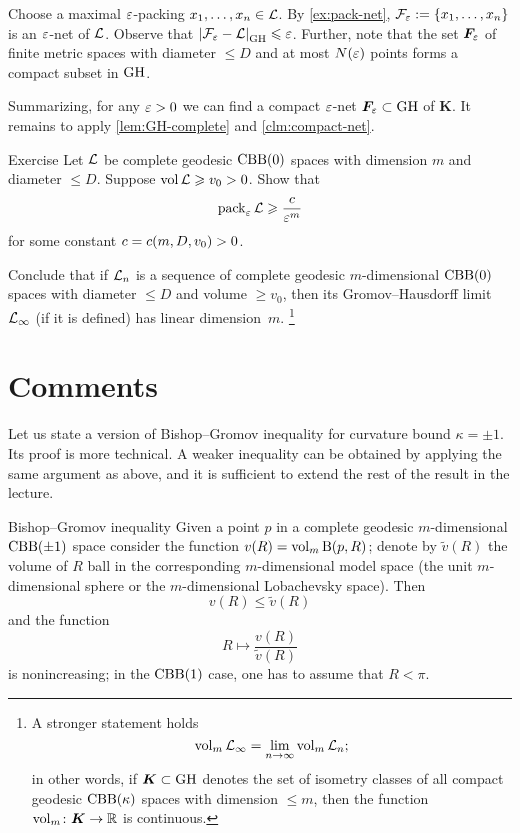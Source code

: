 Choose a maximal $\varepsilon$-packing $x_1,\dots,x_n\in \mathcal{L}$.
By \ref{ex:pack-net}, $\spc{F}_\eps\z\df\{x_1,\dots,x_n\}$ is an $\varepsilon$-net of $\mathcal{L}$.
Observe that $\dist{\spc{F}_\eps}{\spc{L}}{\GH}\le \eps$.
Further, note that the set $\bm{F}_\varepsilon$ of finite metric spaces with diameter $\le D$ and at most $N(\varepsilon)$ points forms a compact subset in $\operatorname{\rm GH}\nolimits$.

Summarizing, for any $\varepsilon>0$ we can find a compact $\varepsilon$-net $\bm{F}_\varepsilon\subset \operatorname{\rm GH}\nolimits$ of $\bm{K}$.
It remains to apply \ref{lem:GH-complete} and \ref{clm:compact-net}.
\qeds

\begin{thm}{Exercise}\label{ex:pack-vol}
Let $\mathcal{L}$ be complete geodesic $\mathrm{CBB}(0)$ spaces with dimension $m$ and diameter $\le D$.
Suppose $\operatorname{\rm vol}\nolimits\mathcal{L}\geqslant v_0>0$.
Show that 
\[\operatorname{\rm pack}\nolimits_\varepsilon\mathcal{L}\geqslant \frac{c}{\varepsilon^m}\]
for some constant $c=c(m,D,v_0)>0$.

Conclude that if $\mathcal{L}_n$ is a sequence of complete geodesic $m$-dimensional $\mathrm{CBB}(0)$ spaces with diameter $\le D$ and volume $\ge v_0$, then its Gromov--Hausdorff limit $\mathcal{L}_\infty$ (if it is defined) has linear dimension~$m$.%
\footnote{A stronger statement holds 
\[\operatorname{\rm vol}\nolimits_m\mathcal{L}_\infty=\lim_{n\to\infty} \operatorname{\rm vol}\nolimits_m\mathcal{L}_n;\]
in other words, if $\bm{K}\subset \operatorname{\rm GH}\nolimits$ denotes the set of isometry classes of all compact geodesic $\mathrm{CBB}(\kappa)$ spaces with dimension $\le m$, then the function
$\operatorname{\rm vol}\nolimits_m\colon\bm{K}\to \mathbb{R}$ is continuous.}
\end{thm}

\section{Comments}

Let us state a version of Bishop--Gromov inequality for curvature bound $\kappa=\pm1$.
Its proof is more technical.
A weaker inequality can be obtained by applying the same argument as above,
and it is sufficient to extend the rest of the result in the lecture.

\begin{thm}{Bishop--Gromov inequality}
Given a point $p$ in a complete geodesic $m$-dimensional $\mathrm{CBB}(\pm1)$ space consider the function $v(R)\z=\vol_m\oBall(p,R)$;
denote by $\tilde v(R)$ the volume of $R$ ball in the corresponding $m$-dimensional model space (the unit $m$-dimensional sphere or the $m$-dimensional Lobachevsky space).
Then 
\[v(R)\le \tilde v(R)\]
and the function 
\[R\mapsto \frac{v(R)}{\tilde v(R)}\] is nonincreasing;
in the $\mathrm{CBB}(1)$ case, one has to assume that $R<\pi$.
\end{thm}

